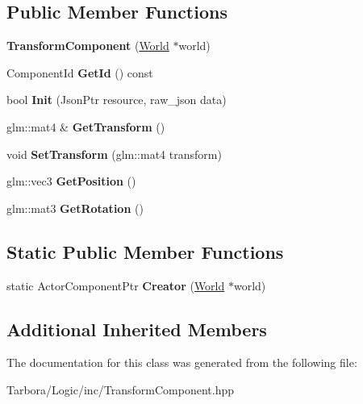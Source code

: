 \subsection*{Public Member Functions}
\begin{DoxyCompactItemize}
\item 
\mbox{\label{classTarbora_1_1TransformComponent_a9aed25c5a53a5b21c1247f1230dd8307}} 
{\bfseries Transform\+Component} (\hyperlink{classTarbora_1_1World}{World} $\ast$world)
\item 
\mbox{\label{classTarbora_1_1TransformComponent_a61107459a83a52bc4ee42dc6b74e881d}} 
Component\+Id {\bfseries Get\+Id} () const
\item 
\mbox{\label{classTarbora_1_1TransformComponent_ab591e060b84d39e6cd5d97b37193c55f}} 
bool {\bfseries Init} (Json\+Ptr resource, raw\+\_\+json data)
\item 
\mbox{\label{classTarbora_1_1TransformComponent_abe8e8d96a33cd38b4d37be4c01ba59ba}} 
glm\+::mat4 \& {\bfseries Get\+Transform} ()
\item 
\mbox{\label{classTarbora_1_1TransformComponent_abb3f01a3863f7dfce1beccab3f4cf014}} 
void {\bfseries Set\+Transform} (glm\+::mat4 transform)
\item 
\mbox{\label{classTarbora_1_1TransformComponent_aae810fc641b72025475c609ad14deca0}} 
glm\+::vec3 {\bfseries Get\+Position} ()
\item 
\mbox{\label{classTarbora_1_1TransformComponent_ac5c3222f0c59c3182dbeaa9bacfd0f94}} 
glm\+::mat3 {\bfseries Get\+Rotation} ()
\end{DoxyCompactItemize}
\subsection*{Static Public Member Functions}
\begin{DoxyCompactItemize}
\item 
\mbox{\label{classTarbora_1_1TransformComponent_a801f1afc58d4b992fa033fdf724f22d0}} 
static Actor\+Component\+Ptr {\bfseries Creator} (\hyperlink{classTarbora_1_1World}{World} $\ast$world)
\end{DoxyCompactItemize}
\subsection*{Additional Inherited Members}


The documentation for this class was generated from the following file\+:\begin{DoxyCompactItemize}
\item 
Tarbora/\+Logic/inc/Transform\+Component.\+hpp\end{DoxyCompactItemize}
